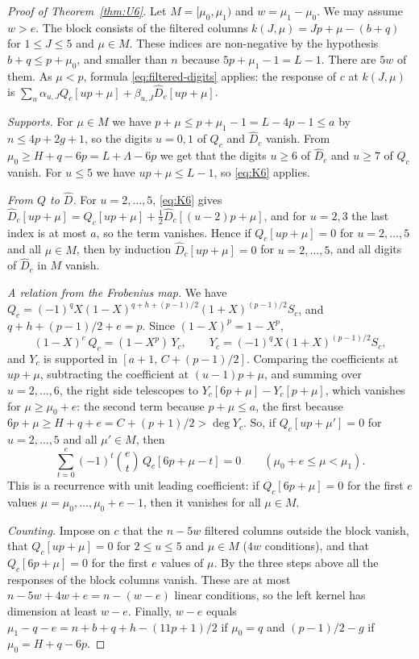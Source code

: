 \begin{proof}[Proof of Theorem~\ref{thm:U6}]
Let $M=[\mu_0,\mu_1)$ and $w=\mu_1-\mu_0$. We may assume $w>e$. The block consists of the filtered columns
$k(J,\mu)=Jp+\mu-(b+q)$ for $1\le J\le5$ and $\mu\in M$. These indices are non-negative by the hypothesis
$b+q\le p+\mu_0$, and smaller than $n$ because $5p+\mu_1-1=L-1$. There are $5w$ of them. As $\mu<p$, formula
\eqref{eq:filtered-digits} applies: the response of $c$ at $k(J,\mu)$ is
$\sum_u\alpha_{u,J}Q_c[up+\mu]+\beta_{u,J}\widehat D_c[up+\mu]$.

\emph{Supports.} For $\mu\in M$ we have $p+\mu\le p+\mu_1-1=L-4p-1\le a$ by $n\le4p+2g+1$, so the digits
$u=0,1$ of $Q_c$ and $\widehat D_c$ vanish. From $\mu_0\ge H+q-6p=L+\Lambda-6p$ we get that the digits $u\ge6$ of
$\widehat D_c$ and $u\ge7$ of $Q_c$ vanish. For $u\le5$ we have $up+\mu\le L-1$, so \eqref{eq:K6} applies.

\emph{From $Q$ to $\widehat D$.} For $u=2,\dots,5$, \eqref{eq:K6} gives
$\widehat D_c[up+\mu]=Q_c[up+\mu]+\tfrac12\widehat D_c[(u-2)p+\mu]$, and for $u=2,3$ the last index is at most $a$,
so the term vanishes. Hence if $Q_c[up+\mu]=0$ for $u=2,\dots,5$ and all $\mu\in M$, then by induction
$\widehat D_c[up+\mu]=0$ for $u=2,\dots,5$, and all digits of $\widehat D_c$ in $M$ vanish.

\emph{A relation from the Frobenius map.} We have
$Q_c=(-1)^qX(1-X)^{q+h+(p-1)/2}(1+X)^{(p-1)/2}S_c$, and $q+h+(p-1)/2+e=p$. Since $(1-X)^p=1-X^p$,
\[
 (1-X)^e\,Q_c=(1-X^p)\,Y_c,\qquad Y_c=(-1)^qX(1+X)^{(p-1)/2}S_c,
\]
and $Y_c$ is supported in $[a+1,\,C+(p-1)/2]$. Comparing the coefficients at $up+\mu$, subtracting the
coefficient at $(u-1)p+\mu$, and summing over $u=2,\dots,6$, the right side telescopes to
$Y_c[6p+\mu]-Y_c[p+\mu]$, which vanishes for $\mu\ge\mu_0+e$: the second term because $p+\mu\le a$, the
first because $6p+\mu\ge H+q+e=C+(p+1)/2>\deg Y_c$. So, if $Q_c[up+\mu']=0$ for $u=2,\dots,5$ and all
$\mu'\in M$, then
\[
 \sum_{t=0}^e(-1)^t\binom et\,Q_c[6p+\mu-t]=0\qquad(\mu_0+e\le\mu<\mu_1).
\]
This is a recurrence with unit leading coefficient: if $Q_c[6p+\mu]=0$ for the first $e$ values
$\mu=\mu_0,\dots,\mu_0+e-1$, then it vanishes for all $\mu\in M$.

\emph{Counting.} Impose on $c$ that the $n-5w$ filtered columns outside the block vanish, that
$Q_c[up+\mu]=0$ for $2\le u\le5$ and $\mu\in M$ ($4w$ conditions), and that $Q_c[6p+\mu]=0$ for the first $e$
values of $\mu$. By the three steps above all the responses of the block columns vanish. These are at
most $n-5w+4w+e=n-(w-e)$ linear conditions, so the left kernel has dimension at least $w-e$. Finally,
$w-e$ equals $\mu_1-q-e=n+b+q+h-(11p+1)/2$ if $\mu_0=q$ and $(p-1)/2-g$ if $\mu_0=H+q-6p$.
\end{proof}

